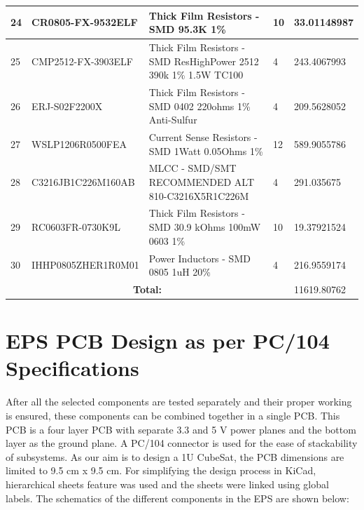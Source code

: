 \begin{table}[ht]
{\begin{tabular}{|llll|l|}
			\multicolumn{1}{|l|}{24} & \multicolumn{1}{l|}{CR0805-FX-9532ELF} & \multicolumn{1}{l|}{Thick Film Resistors   - SMD 95.3K 1\%} & 10 & 33.01148987 \\ \hline
			\multicolumn{1}{|l|}{25} & \multicolumn{1}{l|}{CMP2512-FX-3903ELF} & \multicolumn{1}{l|}{Thick Film Resistors   - SMD ResHighPower 2512 390k 1\% 1.5W TC100} & 4 & 243.4067993 \\ \hline
			\multicolumn{1}{|l|}{26} & \multicolumn{1}{l|}{ERJ-S02F2200X} & \multicolumn{1}{l|}{Thick Film Resistors   - SMD 0402 220ohms 1\% Anti-Sulfur} & 4 & 209.5628052 \\ \hline
			\multicolumn{1}{|l|}{27} & \multicolumn{1}{l|}{WSLP1206R0500FEA} & \multicolumn{1}{l|}{Current Sense   Resistors - SMD 1Watt 0.05Ohms 1\%} & 12 & 589.9055786 \\ \hline
			\multicolumn{1}{|l|}{28} & \multicolumn{1}{l|}{C3216JB1C226M160AB} & \multicolumn{1}{l|}{MLCC - SMD/SMT   RECOMMENDED ALT 810-C3216X5R1C226M} & 4 & 291.035675 \\ \hline
			\multicolumn{1}{|l|}{29} & \multicolumn{1}{l|}{RC0603FR-0730K9L} & \multicolumn{1}{l|}{Thick Film Resistors   - SMD 30.9 kOhms 100mW 0603 1\%} & 10 & 19.37921524 \\ \hline
			\multicolumn{1}{|l|}{30} & \multicolumn{1}{l|}{IHHP0805ZHER1R0M01} & \multicolumn{1}{l|}{Power Inductors - SMD   0805 1uH 20\%} & 4 & 216.9559174 \\ \hline
			\multicolumn{4}{|c|}{\bf{Total:}} & 11619.80762 \\ \hline
		\end{tabular}%
	}
\end{table}



\section{EPS PCB Design as per PC/104 Specifications}
  After all the selected components are tested separately and their proper working is ensured, these components can be combined together in a single PCB. This PCB is a four layer PCB with separate 3.3 and 5 V power planes and the bottom layer as the ground plane. A PC/104 connector is used for the ease of stackability of subsystems. As our aim is to design a 1U CubeSat, the PCB dimensions are limited to 9.5 cm x 9.5 cm. For simplifying the design process in KiCad, hierarchical sheets feature was used and the sheets were linked using global labels. The schematics of the different components in the EPS are shown below:

